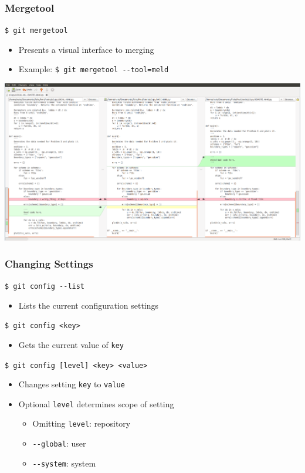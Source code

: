 \documentclass[english,compress]{beamer}
\begin{document}
\begin{frame}[fragile]
    \frametitle{Mergetool}

    \verb|$ git mergetool|
    \begin{itemize}
        \item Presents a visual interface to merging
        \item Example: \verb|$ git mergetool --tool=meld|
    \end{itemize}
    \begin{center}
        \includegraphics[width=.9\textwidth]{figs/meld-screenshot}
    \end{center}

\end{frame}

\begin{frame}[fragile]
    \frametitle{Changing Settings}

	\verb|$ git config --list|
	\begin{itemize}
		\item Lists the current configuration settings
	\end{itemize}
	\verb|$ git config <key>|
	\begin{itemize}
		\item Gets the current value of \verb|key|
	\end{itemize}
	\verb|$ git config [level] <key> <value>|
	\begin{itemize}
		\item Changes setting \verb|key| to \verb|value|
		\item Optional \verb|level| determines scope of setting
		\begin{itemize}
			\item Omitting \verb|level|: repository
			\item \verb|--global|: user
			\item \verb|--system|: system
		\end{itemize}
	\end{itemize}
\end{frame}
\end{document}
